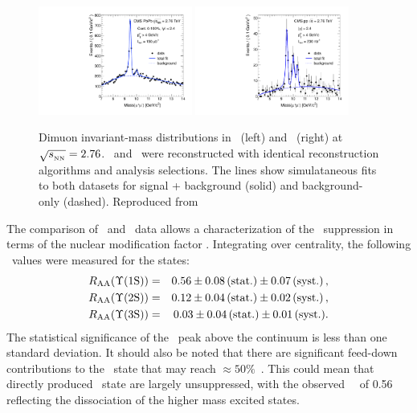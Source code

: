 \begin{figure}[t]
\begin{center}
    \includegraphics[width=0.45\textwidth]{qqbarfigures/hiFitPt4Erf}
    \includegraphics[width=0.45\textwidth]{qqbarfigures/ppFitPt4Erf}
    \caption{Dimuon invariant-mass distributions in \PbPb\ (left) and \pp\ (right)
at $\sqrt{s_{_{\rm NN}}} = 2.76$\TeV. \PbPb\ and \pp\ were reconstructed with identical
reconstruction algorithms and analysis selections. The lines show simulataneous fits to both
datasets for signal + background (solid) and background-only (dashed).
Reproduced from~\cite{Chatrchyan:2012lxa}}
\label{fig:GR:mass}
\end{center}
\end{figure}

The comparison of \pp\ and \PbPb\ data allows a characterization of the \PgU\ suppression
in terms of the nuclear modification factor \Raa.
Integrating over centrality, the following \Raa\ values were measured for the \PgUn states:
\begin{eqnarray}
R_\mathrm{AA} (\Upsilon\mathrm{(1S)}) &=& 0.56 \pm 0.08\,\mbox{(stat.)} \pm 0.07\,\mbox{(syst.)} \,, \\
R_\mathrm{AA} (\Upsilon\mathrm{(2S)}) &=& 0.12 \pm 0.04\,\mbox{(stat.)} \pm 0.02\,\mbox{(syst.)} \,, \nonumber \\
R_\mathrm{AA} (\Upsilon\mathrm{(3S)}) &=& 0.03 \pm 0.04\,\mbox{(stat.)} \pm 0.01\,\mbox{(syst.)} .  \nonumber
\end{eqnarray}
The statistical significance of the \PgUc\ peak above the continuum is less than one standard deviation.
It should also be noted that there are significant feed-down contributions to
the \PgUa\ state that may reach $\approx 50\%$~\cite{Affolder:1999wm, Aaij:2012se}.
This could mean that directly produced \PgUa\ state are largely unsuppressed, with
the observed \PgUa\ \Raa\ of 0.56 reflecting the dissociation of the higher mass excited states.

